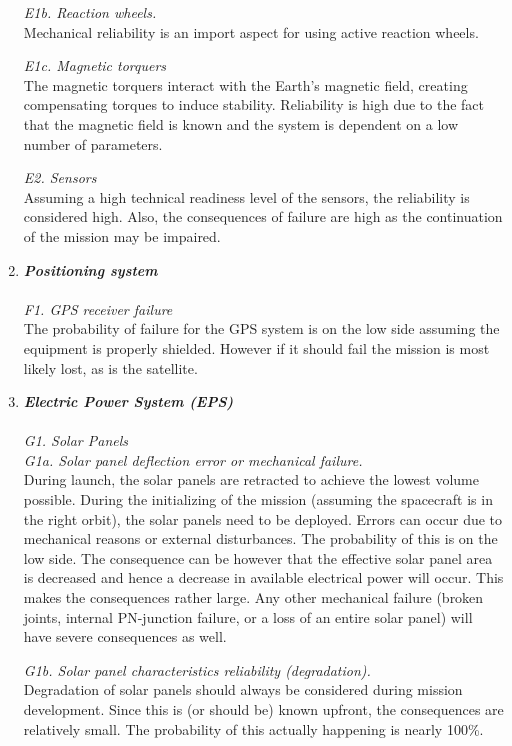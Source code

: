 \documentclass[11pt]{report}
\begin{document}
\begin{enumerate}[A]
\textit{E1b. Reaction wheels.}\\ 
Mechanical reliability is an import aspect for using active reaction wheels. 

\textit{E1c. Magnetic torquers}\\ 
The magnetic torquers interact with the Earth's magnetic field, creating compensating torques to induce stability. Reliability is high due to the fact that the magnetic field is known and the system is dependent on a low number of parameters.

\textit{E2. Sensors}\\ 
Assuming a high technical readiness level of the sensors, the reliability is considered high. Also, the consequences of failure are high as the continuation of the mission may be impaired.

	\item  \textbf{\textit{Positioning system}} \\\\
\textit{F1. GPS receiver failure}\\
The probability of failure for the GPS system is on the low side assuming the equipment is properly shielded. However if it should fail the mission is most likely lost, as is the satellite.

	\item  \textbf{\textit{Electric Power System (EPS)}} \\\\
\textit{G1. Solar Panels}\\

\textit{G1a. Solar panel deflection error or mechanical failure.}\\ 
During launch, the solar panels are retracted to achieve the lowest volume possible. During the initializing of the mission (assuming the spacecraft is in the right orbit), the solar panels need to be deployed. Errors can occur due to mechanical reasons or external disturbances. The probability of this is on the low side. The consequence can be however that the effective solar panel area is decreased and hence a decrease in available electrical power will occur. This makes the consequences rather large. Any other mechanical failure (broken joints, internal PN-junction failure, or a loss of an entire solar panel) will have severe consequences as well. 

\textit{G1b. Solar panel characteristics reliability (degradation).}\\ Degradation of solar panels should always be considered during mission development. Since this is (or should be) known upfront, the consequences are relatively small. The probability of this actually happening is nearly 100\%.


\end{enumerate}
\end{document}
